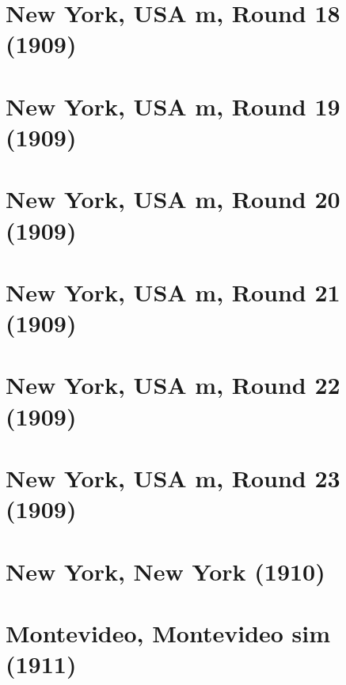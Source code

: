 \documentclass[11pt]{article}
\begin{document}
\section{New York, USA m, Round 18 (1909)}


\clearpage

\section{New York, USA m, Round 19 (1909)}


\clearpage

\section{New York, USA m, Round 20 (1909)}


\clearpage

\section{New York, USA m, Round 21 (1909)}


\clearpage

\section{New York, USA m, Round 22 (1909)}


\clearpage

\section{New York, USA m, Round 23 (1909)}


\clearpage

\section{New York, New York (1910)}


\clearpage



\clearpage

\section{Montevideo, Montevideo sim (1911)}

\end{document}
